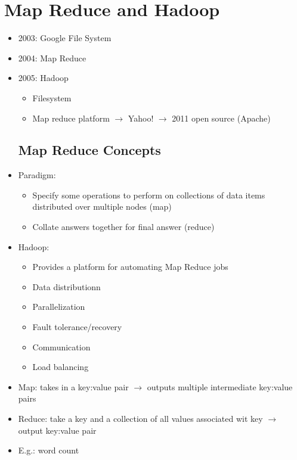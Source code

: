 \documentclass[12pt]{article}
\begin{document}
	\section*{Map Reduce and Hadoop}
		\begin{itemize}
			\item
				2003: Google File System
			\item
				2004: Map Reduce
			\item
				2005: Hadoop
				\begin{itemize}
					\item
						Filesystem
					\item
						Map reduce platform $\rightarrow$ Yahoo! $\rightarrow$ 2011 open source (Apache)
				\end{itemize}
		\subsection*{Map Reduce Concepts}
			\item
				Paradigm:
				\begin{itemize}
					\item
						Specify some operations to perform on collections of data items distributed over multiple nodes (map)
					\item
						Collate answers together for final answer (reduce)
				\end{itemize}
			\item
				Hadoop:
				\begin{itemize}
					\item
						Provides a platform for automating Map Reduce jobs
					\item
						Data distributionn
					\item
						Parallelization
					\item
						Fault tolerance/recovery
					\item
						Communication
					\item
						Load balancing
				\end{itemize}
			\item
				Map: takes in a key:value pair $\rightarrow$ outputs multiple intermediate key:value pairs
			\item
				Reduce: take a key and a collection of all values associated wit key $\rightarrow$ output key:value pair
			\item
				E.g.: word count

\end{itemize}
\end{document}
